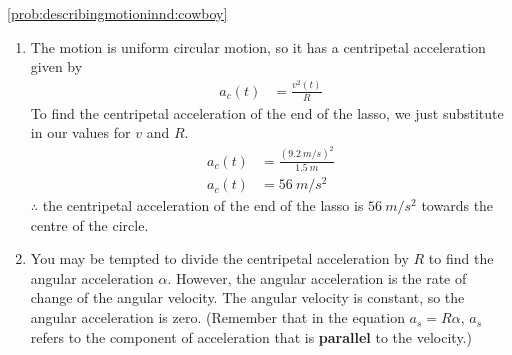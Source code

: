 \begin{solution}{\ref{prob:describingmotioninnd:cowboy}}
{\begin{enumerate}[label=\alph*)]
$\therefore$ it takes $\SI{1.0}{s}$ for the lasso to complete one revolution.
\item The motion is uniform circular motion, so it has a centripetal acceleration given by
\begin{align*}
a_c(t)&=\frac{v^2(t)}{R}
\end{align*}
To find the centripetal acceleration of the end of the lasso, we just substitute in our values for $v$ and $R$.
\begin{align*}
a_c(t)&=\frac{(\SI{9.2}{m/s})^2}{\SI{1.5}{m}}\\
a_c(t)&=\SI{56}{m/s^2}
\end{align*}
$\therefore$ the centripetal acceleration of the end of the lasso is $\SI{56}{m/s^2}$ towards the centre of the circle. 
\item You may be tempted to divide the centripetal acceleration by $R$ to find the angular acceleration $\alpha$. However, the angular acceleration is the rate of change of the angular velocity. The angular velocity is constant, so the angular acceleration is zero. (Remember that in the equation $a_s=R\alpha$, $a_s$ refers to the component of acceleration that is \textbf{parallel} to the velocity.)
\end{enumerate}}
\end{solution}
